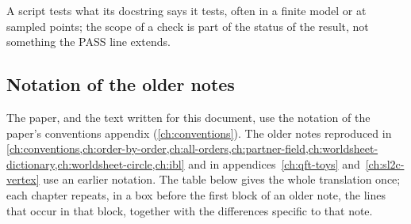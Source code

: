 A script tests what its docstring says it tests, often in a finite model or at sampled points; the scope of a check is part of the status of the result, not something the PASS line extends.

\subsection{Notation of the older notes}
\label{sec:pre:notation}

The paper, and the text written for this document, use the notation of the paper's conventions appendix (\cref{ch:conventions}).
The older notes reproduced in \cref{ch:conventions,ch:order-by-order,ch:all-orders,ch:partner-field,ch:worldsheet-dictionary,ch:worldsheet-circle,ch:ibl} and in appendices~\ref{ch:qft-toys} and~\ref{ch:sl2c-vertex} use an earlier notation.
The table below gives the whole translation once; each chapter repeats, in a box before the first block of an older note, the lines that occur in that block, together with the differences specific to that note.

